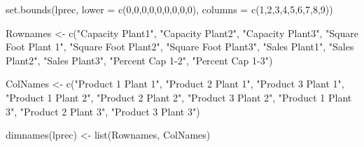 \documentclass[
]{article}
\newenvironment{Shaded}{\begin{snugshade}}{\end{snugshade}}
\newcommand{\AttributeTok}[1]{\textcolor[rgb]{0.77,0.63,0.00}{#1}}
\newcommand{\DecValTok}[1]{\textcolor[rgb]{0.00,0.00,0.81}{#1}}
\newcommand{\FunctionTok}[1]{\textcolor[rgb]{0.00,0.00,0.00}{#1}}
\newcommand{\NormalTok}[1]{#1}
\newcommand{\OtherTok}[1]{\textcolor[rgb]{0.56,0.35,0.01}{#1}}
\newcommand{\StringTok}[1]{\textcolor[rgb]{0.31,0.60,0.02}{#1}}
\begin{document}
\begin{Shaded}
\begin{Highlighting}[]
\FunctionTok{set.bounds}\NormalTok{(lprec, }\AttributeTok{lower =} \FunctionTok{c}\NormalTok{(}\DecValTok{0}\NormalTok{,}\DecValTok{0}\NormalTok{,}\DecValTok{0}\NormalTok{,}\DecValTok{0}\NormalTok{,}\DecValTok{0}\NormalTok{,}\DecValTok{0}\NormalTok{,}\DecValTok{0}\NormalTok{,}\DecValTok{0}\NormalTok{,}\DecValTok{0}\NormalTok{), }\AttributeTok{columns =} \FunctionTok{c}\NormalTok{(}\DecValTok{1}\NormalTok{,}\DecValTok{2}\NormalTok{,}\DecValTok{3}\NormalTok{,}\DecValTok{4}\NormalTok{,}\DecValTok{5}\NormalTok{,}\DecValTok{6}\NormalTok{,}\DecValTok{7}\NormalTok{,}\DecValTok{8}\NormalTok{,}\DecValTok{9}\NormalTok{))}
\end{Highlighting}
\end{Shaded}

\begin{Shaded}
\begin{Highlighting}[]
\NormalTok{Rownames }\OtherTok{\textless{}{-}} \FunctionTok{c}\NormalTok{(}\StringTok{"Capacity Plant1"}\NormalTok{, }\StringTok{"Capacity Plant2"}\NormalTok{, }\StringTok{"Capacity Plant3"}\NormalTok{, }\StringTok{"Square Foot Plant 1"}\NormalTok{, }\StringTok{"Square Foot Plant2"}\NormalTok{, }\StringTok{"Square Foot Plant3"}\NormalTok{, }\StringTok{"Sales Plant1"}\NormalTok{, }\StringTok{"Sales Plant2"}\NormalTok{, }\StringTok{"Sales Plant3"}\NormalTok{, }\StringTok{"Percent Cap 1{-}2"}\NormalTok{, }\StringTok{"Percent Cap 1{-}3"}\NormalTok{)}

\NormalTok{ColNames }\OtherTok{\textless{}{-}} \FunctionTok{c}\NormalTok{(}\StringTok{"Product 1 Plant 1"}\NormalTok{, }\StringTok{"Product 2 Plant 1"}\NormalTok{, }\StringTok{"Product 3 Plant 1"}\NormalTok{, }\StringTok{"Product 1 Plant 2"}\NormalTok{, }\StringTok{"Product 2 Plant 2"}\NormalTok{, }\StringTok{"Product 3 Plant 2"}\NormalTok{, }\StringTok{"Product 1 Plant 3"}\NormalTok{, }\StringTok{"Product 2 Plant 3"}\NormalTok{, }\StringTok{"Product 3 Plant 3"}\NormalTok{)}
\end{Highlighting}
\end{Shaded}

\begin{Shaded}
\begin{Highlighting}[]
\FunctionTok{dimnames}\NormalTok{(lprec) }\OtherTok{\textless{}{-}} \FunctionTok{list}\NormalTok{(Rownames, ColNames)}
\end{Highlighting}
\end{Shaded}
\end{document}
